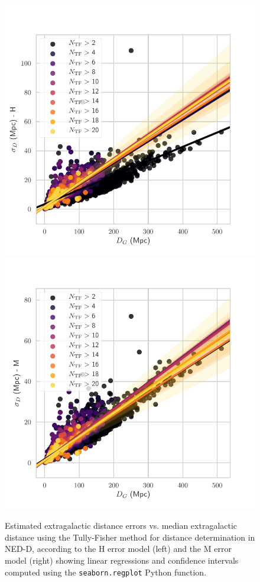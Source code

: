 \documentclass[a4paper,fleqn,usenatbib]{mnras}
\begin{document}
\begin{figure}
	\includegraphics[scale=0.69]{HrelerrTF}
	\includegraphics[scale=0.69]{MrelerrTF}
    \caption{Estimated extragalactic distance errors vs. median extragalactic distance using the Tully-Fisher method for distance determination in NED-D, according to the H error model (left) and the M error model (right) showing linear regressions and confidence intervals computed using the \texttt{seaborn.regplot} Python function.}
    \label{fig:relerr}
\end{figure}
\end{document}
